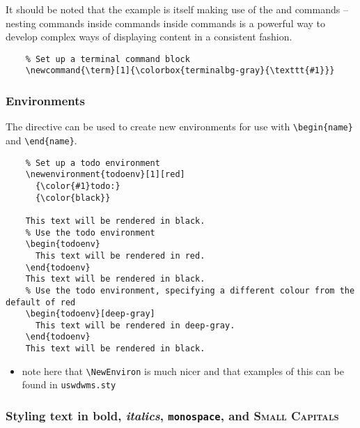 It should be noted that the example is itself making use of the  and  commands -- nesting commands inside commands inside commands is a powerful way to develop complex ways of displaying content in a consistent fashion.

\begin{listing}[H]
  \captionsetup{skip=\skiplistingcaptionlen}
  \begin{verbatim}
    % Set up a terminal command block
    \newcommand{\term}[1]{\colorbox{terminalbg-gray}{\texttt{#1}}}
  \end{verbatim}
  \caption{\texttt{\textbackslash newcommand} command example}
  \label{example:lst:basic_syntax:newcommand}
\end{listing}

\subsubsection{Environments}
The  directive can be used to create new environments for use with \texttt{\textbackslash begin\{name\}} and \texttt{\textbackslash end\{name\}}.

\begin{listing}[H]
  \captionsetup{skip=\skiplistingcaptionlen}
  \begin{verbatim}
    % Set up a todo environment
    \newenvironment{todoenv}[1][red]
      {\color{#1}todo:}
      {\color{black}}

    This text will be rendered in black.
    % Use the todo environment
    \begin{todoenv}
      This text will be rendered in red.
    \end{todoenv}
    This text will be rendered in black.
    % Use the todo environment, specifying a different colour from the default of red
    \begin{todoenv}[deep-gray]
      This text will be rendered in deep-gray.
    \end{todoenv}
    This text will be rendered in black.
  \end{verbatim}
  \caption{\texttt{\textbackslash newenvironment} command example}
  \label{example:lst:basic_syntax:newenvironment}
\end{listing}

\noindent\begin{todoenv}
  \begin{itemize}
    \item note here that \texttt{\textbackslash NewEnviron} is much nicer and that examples of this can be found in \texttt{uswdwms.sty}
  \end{itemize}
\end{todoenv}

\pagebreak
\subsubsection{Styling text in \textbf{bold}, \textit{italics}, \texttt{monospace}, and \textsc{Small Capitals}}

